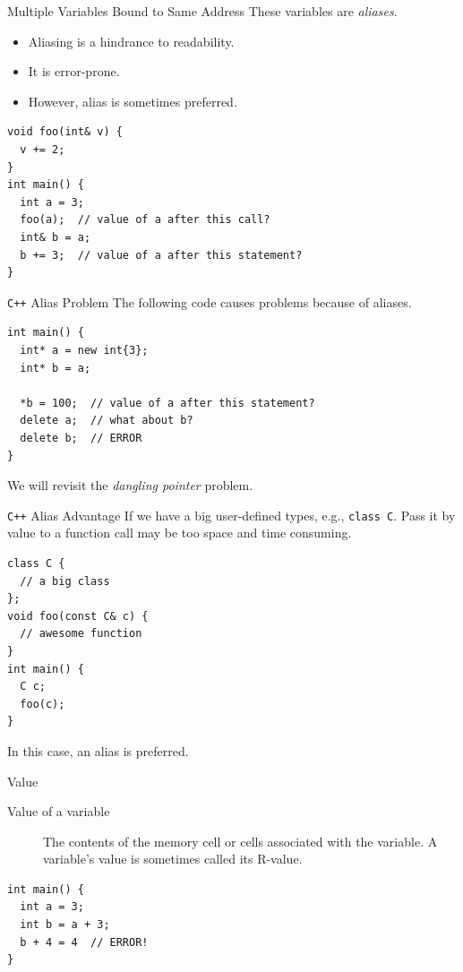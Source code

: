 \documentclass[presentation]{beamer}
\begin{document}
\begin{frame}[fragile,label={sec:orgheadline10}]{Multiple Variables Bound to Same Address}
 These variables are \emph{aliases}.

\begin{itemize}
\item Aliasing is a hindrance to readability.
\item It is error-prone.
\item However, alias is sometimes preferred.
\end{itemize}


\begin{verbatim}
void foo(int& v) {
  v += 2;
}
int main() {
  int a = 3;
  foo(a);  // value of a after this call?
  int& b = a;
  b += 3;  // value of a after this statement?
}
\end{verbatim}
\end{frame}

\begin{frame}[fragile,label={sec:orgheadline11}]{\texttt{C++} Alias Problem}
 The following code causes problems because of aliases.

\begin{verbatim}
int main() {
  int* a = new int{3};
  int* b = a;

  *b = 100;  // value of a after this statement?
  delete a;  // what about b?
  delete b;  // ERROR
}
\end{verbatim}

We will revisit the \emph{dangling pointer} problem.
\end{frame}

\begin{frame}[fragile,label={sec:orgheadline12}]{\texttt{C++} Alias Advantage}
 If we have a big user-defined types, e.g., \texttt{class C}.  Pass it by
value to a function call may be too space and time consuming.

\begin{verbatim}
class C {
  // a big class
};
void foo(const C& c) {
  // awesome function
}
int main() {
  C c;
  foo(c);
}
\end{verbatim}

In this case, an alias is preferred.
\end{frame}

\begin{frame}[fragile,label={sec:orgheadline13}]{Value}
 \begin{description}
\item[{Value of a variable}] The contents of the memory cell or cells
associated with the variable.  A variable's value is sometimes
called its R-value.
\end{description}


\begin{verbatim}
int main() {
  int a = 3;
  int b = a + 3;
  b + 4 = 4  // ERROR!
}
\end{verbatim}
\end{frame}
\end{document}
